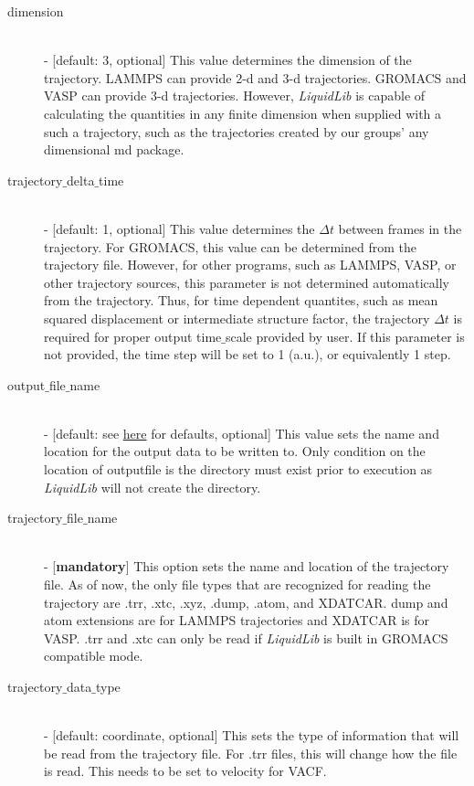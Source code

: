 \documentclass{article}
\begin{document}
\begin{description}
	\item[dimension] \hfill \\
	- [default: 3, optional] This value determines the dimension of the trajectory.  LAMMPS can provide 2-d and 3-d trajectories.  GROMACS and VASP can provide 3-d trajectories.  However, \textit{LiquidLib} is capable of calculating the quantities in any finite dimension when supplied with a such a trajectory, such as the trajectories created by our groups' any dimensional md package. 
	
	\item[trajectory$\_$delta$\_$time] \hfill \\
	- [default: 1, optional] This value determines the $\Delta t$ between frames in the trajectory.  For GROMACS, this value can be determined from the trajectory file.  However, for other programs, such as LAMMPS, VASP, or other trajectory sources, this parameter is not determined automatically from the trajectory.  Thus, for time dependent quantites, such as mean squared displacement or intermediate structure factor, the trajectory $\Delta t$ is required for proper output time$\_$scale provided by user.  If this parameter is not provided, the time step will be set to 1 (a.u.), or equivalently 1 step. 
	
	\item[output$\_$file$\_$name] \hfill \\
	- [default: see \hyperref[input_output]{here} for defaults, optional] This value sets the name and location for the output data to be written to.  Only condition on the location of outputfile is the directory must exist prior to execution as \textit{LiquidLib} will not create the directory.
	
	\item[trajectory$\_$file$\_$name] \hfill \\
	- [\textbf{mandatory}] This option sets the name and location of the trajectory file.  As of now, the only file types that are recognized for reading the trajectory are .trr, .xtc, .xyz, .dump, .atom, and XDATCAR.  dump and atom extensions are for LAMMPS trajectories and XDATCAR is for VASP.  .trr and .xtc can only be read if \textit{LiquidLib} is built in GROMACS compatible mode.
	
	\item[trajectory$\_$data$\_$type] \hfill \\
	- [default: coordinate, optional] This sets the type of information that will be read from the trajectory file.  For .trr files, this will change how the file is read.  This needs to be set to velocity for VACF.  
	

\end{description}
\end{document}
